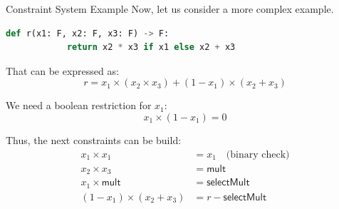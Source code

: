 \documentclass{zkdl-presentation-template}
\begin{document}
    \begin{frame}[fragile]{Constraint System Example}
        Now, let us consider a more complex example.
        \begin{lstlisting}[language=Python,numbers=none]
        def r(x1: F, x2: F, x3: F) -> F:
            return x2 * x3 if x1 else x2 + x3
        \end{lstlisting}

        \vspace{-10pt}

        That can be expressed as:
        \begin{equation*}
            r = x_1 \times (x_2 \times x_3) + (1 - x_1) \times (x_2 + x_3)
        \end{equation*}
        
        \pause
        \begin{alertblock}{}
            We need a boolean restriction for $x_1$:
            \vspace{-8pt}
            \begin{equation*}
                x_1 \times (1 - x_1) = 0
            \end{equation*}
        \end{alertblock}

        \pause
        Thus, the next constraints can be build:
        \vspace{-5pt}
        \begin{align*}
            x_1 \times x_1 &= x_1 \quad \text{(binary check)} \tag{1} \\
            x_2 \times x_3 &= \mathsf{mult} \tag{2} \\
            x_1 \times \mathsf{mult} &= \mathsf{selectMult} \tag{3} \\
            (1 - x_1) \times (x_2 + x_3) &= r - \mathsf{selectMult} \tag{4}
        \end{align*}
    \end{frame}
\end{document}
